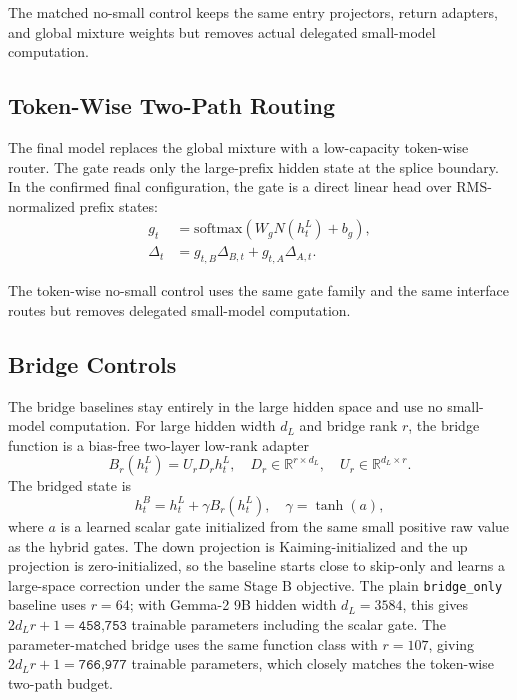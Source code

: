 \documentclass[11pt]{article}
\begin{document}
The matched no-small control keeps the same entry projectors, return adapters, and global mixture weights but removes actual delegated small-model computation.

\subsection{Token-Wise Two-Path Routing}

The final model replaces the global mixture with a low-capacity token-wise router. The gate reads only the large-prefix hidden state at the splice boundary. In the confirmed final configuration, the gate is a direct linear head over RMS-normalized prefix states:
\begin{align}
g_t &= \mathrm{softmax}(W_g N(h_t^L) + b_g),\\
\Delta_t &= g_{t,B}\Delta_{B,t} + g_{t,A}\Delta_{A,t}.
\end{align}

The token-wise no-small control uses the same gate family and the same interface routes but removes delegated small-model computation.

\subsection{Bridge Controls}

The bridge baselines stay entirely in the large hidden space and use no small-model computation. For large hidden width $d_L$ and bridge rank $r$, the bridge function is a bias-free two-layer low-rank adapter
\begin{equation}
B_r(h_t^L) = U_r D_r h_t^L,\quad D_r \in \mathbb{R}^{r \times d_L},\quad U_r \in \mathbb{R}^{d_L \times r}.
\end{equation}
The bridged state is
\begin{equation}
h_t^B = h_t^L + \gamma B_r(h_t^L),\quad \gamma = \tanh(a),
\end{equation}
where $a$ is a learned scalar gate initialized from the same small positive raw value as the hybrid gates. The down projection is Kaiming-initialized and the up projection is zero-initialized, so the baseline starts close to skip-only and learns a large-space correction under the same Stage B objective. The plain \texttt{bridge\_only} baseline uses $r=64$; with Gemma-2 9B hidden width $d_L=3584$, this gives $2d_Lr+1=\texttt{458,753}$ trainable parameters including the scalar gate. The parameter-matched bridge uses the same function class with $r=107$, giving $2d_Lr+1=\texttt{766,977}$ trainable parameters, which closely matches the token-wise two-path budget.
\end{document}
